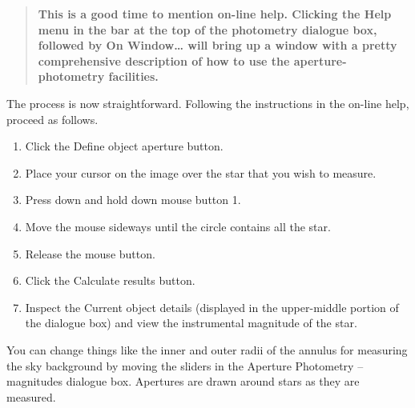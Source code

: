 \documentclass[twoside,11pt]{article}
\begin{document}
\begin{enumerate}
  \begin{quote}
   {\bf This is a good time to mention on-line help.  Clicking the
   {\sf Help} menu in the bar at the top of the photometry dialogue box,
   followed by {\sf On Window\ldots} will bring up a window with a pretty
   comprehensive description of how to use the aperture-photometry
   facilities.}
  \end{quote}

   The process is now straightforward. Following the instructions in the
   on-line help, proceed as follows.

  \begin{enumerate}

     \item Click the {\sf Define object aperture} button.

     \item Place your cursor on the image over the star that you wish
      to measure.

     \item Press down and hold down mouse button 1.

     \item Move the mouse sideways until the circle contains all the star.

     \item Release the mouse button.

     \item Click the {\sf Calculate results} button.

     \item Inspect the {\sf Current object details} (displayed in the
      upper-middle portion of the dialogue box) and view the instrumental
      magnitude of the star.

  \end{enumerate}

   You can change things like the inner and outer radii of the annulus for
   measuring the sky background by moving the sliders in the {\sf Aperture
   Photometry -- magnitudes} dialogue box.  Apertures are drawn around
   stars as they are measured.


\end{enumerate}
\end{document}
